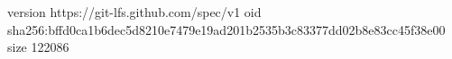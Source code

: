 version https://git-lfs.github.com/spec/v1
oid sha256:bffd0ca1b6dec5d8210e7479e19ad201b2535b3c83377dd02b8e83cc45f38e00
size 122086
